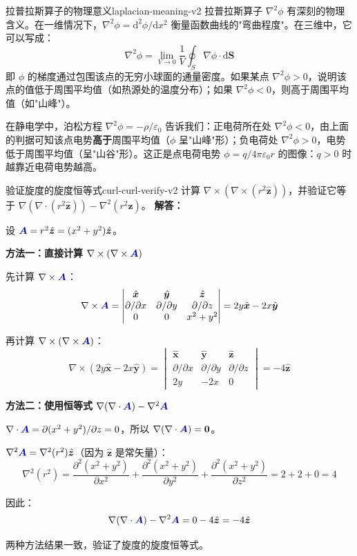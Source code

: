 \documentclass[11pt,a4paper,openany,oneside]{book}
\newcommand{\diff}{\mathrm{d}}
\newcommand{\vecA}{\textcolor{blue!70!black}{\vect{A}}}
\newcommand{\eps}{\varepsilon}
\newcommand{\vect}[1]{\bm{#1}}
\newcommand{\unitvec}[1]{\hat{\vect{#1}}}
\newcommand{\grad}{\nabla}
\newcommand{\lap}{\nabla^2}
\newcommand{\difficulty}[1]{\marginnote{\textcolor{red}{\textbf{[#1]}}}}
\begin{document}
\begin{insight}{拉普拉斯算子的物理意义}{laplacian-meaning-v2}
拉普拉斯算子 $\lap\phi$ 有深刻的物理含义。在一维情况下，$\lap\phi = \diff^2\phi/\diff x^2$ 衡量函数曲线的"弯曲程度"。在三维中，它可以写成：
\[
\lap\phi = \lim_{V\to 0} \frac{1}{V} \oint_S \grad\phi \cdot \diff\vect{S}
\]
即 $\phi$ 的梯度通过包围该点的无穷小球面的通量密度。如果某点 $\lap\phi > 0$，说明该点的值低于周围平均值（如热源处的温度分布）；如果 $\lap\phi < 0$，则高于周围平均值（如"山峰"）。

在静电学中，泊松方程 $\lap\phi = -\rho/\eps_0$ 告诉我们：正电荷所在处 $\lap\phi<0$，由上面的判据可知该点电势\textbf{高于}周围平均值（$\phi$ 呈"山峰"形）；负电荷处 $\lap\phi>0$，电势低于周围平均值（呈"山谷"形）。这正是点电荷电势 $\phi = q/4\pi\eps_0 r$ 的图像：$q>0$ 时越靠近电荷电势越高。
\end{insight}

\begin{example}{验证旋度的旋度恒等式}{curl-curl-verify-v2}
\difficulty{提高}
计算 $\nabla\times(\nabla\times(r^2\unitvec{z}))$，并验证它等于 $\nabla(\nabla\cdot(r^2\unitvec{z})) - \nabla^2(r^2\unitvec{z})$。
\tcblower
\textbf{解答：}

设 $\vecA = r^2\unitvec{z} = (x^2+y^2)\unitvec{z}$。

\textbf{方法一：直接计算 $\nabla\times(\nabla\times\vecA)$}

先计算 $\nabla\times\vecA$：
\[
\nabla\times\vecA = \begin{vmatrix}
\unitvec{x} & \unitvec{y} & \unitvec{z} \\
\partial/\partial x & \partial/\partial y & \partial/\partial z \\
0 & 0 & x^2+y^2
\end{vmatrix}
= 2y\unitvec{x} - 2x\unitvec{y}
\]

再计算 $\nabla\times(\nabla\times\vecA)$：
\[
\nabla\times(2y\unitvec{x} - 2x\unitvec{y}) = \begin{vmatrix}
\unitvec{x} & \unitvec{y} & \unitvec{z} \\
\partial/\partial x & \partial/\partial y & \partial/\partial z \\
2y & -2x & 0
\end{vmatrix}
= -4\unitvec{z}
\]

\textbf{方法二：使用恒等式 $\nabla(\nabla\cdot\vecA) - \nabla^2\vecA$}

$\nabla\cdot\vecA = \partial(x^2+y^2)/\partial z = 0$，所以 $\nabla(\nabla\cdot\vecA) = \vect{0}$。

$\nabla^2\vecA = \nabla^2(r^2)\unitvec{z}$（因为 $\unitvec{z}$ 是常矢量）：
\[
\nabla^2(r^2) = \frac{\partial^2(x^2+y^2)}{\partial x^2} + \frac{\partial^2(x^2+y^2)}{\partial y^2} + \frac{\partial^2(x^2+y^2)}{\partial z^2} = 2 + 2 + 0 = 4
\]

因此：
\[
\nabla(\nabla\cdot\vecA) - \nabla^2\vecA = 0 - 4\unitvec{z} = -4\unitvec{z}
\]

两种方法结果一致，验证了旋度的旋度恒等式。
\end{example}
\end{document}

